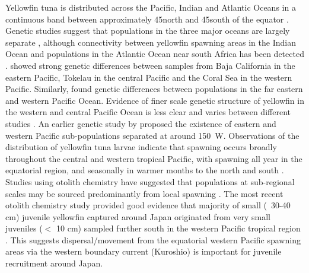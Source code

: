 Yellowfin tuna is distributed across the Pacific, Indian and Atlantic Oceans in a continuous band between approximately 45\degree north and 45\degree south of the equator \citep{grewe_evidence_2015,moore_defining_2020}. Genetic studies suggest that populations in the three major oceans are largely separate \citep{pecoraro_population_2018,moore_defining_2020}, although connectivity between yellowfin spawning areas in the Indian Ocean and populations in the Atlantic Ocean near south Africa has been detected \citep{mullins_genomic_2018}. \citet{grewe_evidence_2015} showed strong genetic differences between samples from Baja California in the eastern Pacific, Tokelau in the central Pacific and the Coral Sea in the western Pacific. Similarly, \citet{pecoraro_population_2018} found genetic differences between populations in the far eastern and western Pacific Ocean. Evidence of finer scale genetic structure of yellowfin in the western and central Pacific Ocean is less clear and varies between different studies \citep{appleyard_population_2001,aguila_distinct_2015,pecoraro_population_2018,anderson_close_2019,evans_connectivity_2019}. An earlier genetic study by \citet{ward_allozyme_1994} proposed the existence of eastern and western Pacific sub-populations separated at around 150\degree~W. Observations of the distribution of yellowfin tuna larvae indicate that spawning occurs broadly throughout the central and western tropical Pacific, with spawning all year in the equatorial region, and seasonally in warmer months to the north and south \citep{nishikawa_average_1985,ijima_tuna_2023}. Studies using otolith chemistry have suggested that populations at sub-regional scales may be sourced predominantly from local spawning \citep{wells_nursery_2012,rooker_natal_2016,proctor_population_2019}. The most recent otolith chemistry study provided good evidence that majority of small (~30-40 cm) juvenile yellowfin captured around Japan originated from very small juveniles ($<$ 10 cm) sampled further south in the western Pacific tropical region \citep{satoh_connectivity_2023}. This suggests dispersal/movement from the equatorial western Pacific spawning areas via the western boundary current (Kuroshio) is important for juvenile recruitment around Japan.

